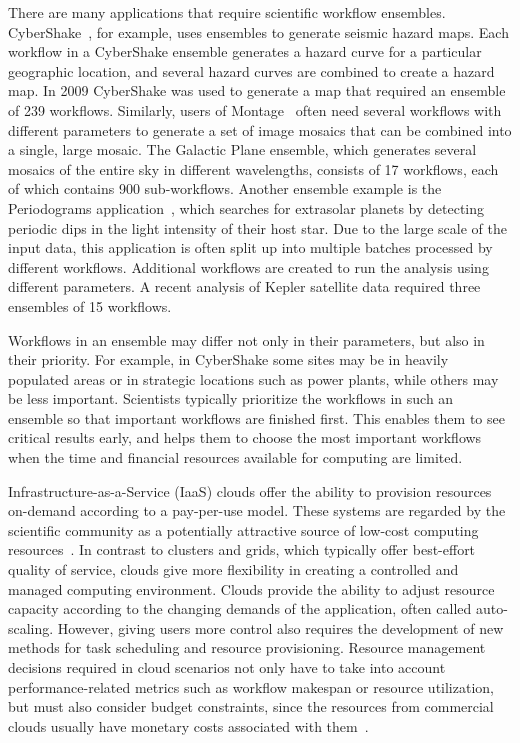 \documentclass[conference]{IEEEtran}
\begin{document}
There are many applications that require scientific workflow ensembles.
CyberShake~\cite{Callaghan2011}, for example, uses ensembles to generate
seismic hazard maps.  Each workflow in a CyberShake ensemble generates a
hazard curve for a particular geographic location, and several hazard curves
are combined to create a hazard map.  In 2009 CyberShake was used to generate
a map that required an ensemble of 239 workflows.  Similarly, users of
Montage~\cite{Deelman2008} often need several workflows  with different
parameters to generate a set of image mosaics that can be combined  into a
single, large mosaic. The Galactic Plane ensemble, which generates several
mosaics of the  entire sky in different wavelengths, consists of 17 workflows,
each of which contains 900 sub-workflows.  Another ensemble example is the
Periodograms application~\cite{Vockler2011}, which searches for extrasolar
planets by detecting periodic dips in the light intensity of their host star.
Due to the large scale of the input data, this application is often split up
into multiple batches processed by different workflows. Additional workflows
are created to run the analysis using different parameters. A recent analysis
of Kepler satellite data required three ensembles of 15 workflows.

Workflows in an ensemble may differ not only in their parameters, but also in
their priority. For example, in CyberShake some sites may be in heavily
populated areas or in strategic locations such as power plants, while others
may be less important. Scientists typically prioritize the workflows in such
an ensemble so that important workflows are finished first. This enables them
to see critical results early, and helps them to choose the most important
workflows when the time and financial resources available for computing are
limited.

Infrastructure-as-a-Service (IaaS) clouds offer the ability to provision 
resources on-demand according to a pay-per-use model. These systems 
are regarded by the scientific community as a potentially attractive source of 
low-cost computing resources~\cite{Ostermann2010, Keahey2009}. In contrast 
to clusters and grids, which typically offer best-effort quality of service, clouds 
give more flexibility in creating a controlled and managed computing environment.
Clouds provide the ability to adjust resource capacity according to the changing
demands of the application, often called auto-scaling. However, giving users 
more control also requires the development of new methods for task 
scheduling and resource provisioning. Resource management decisions required 
in cloud scenarios not only have to take into account performance-related 
metrics such as workflow makespan or resource utilization, but must also consider
budget constraints, since the resources from commercial clouds
usually have monetary costs associated with them~\cite{Durkee2010}.
\end{document}
